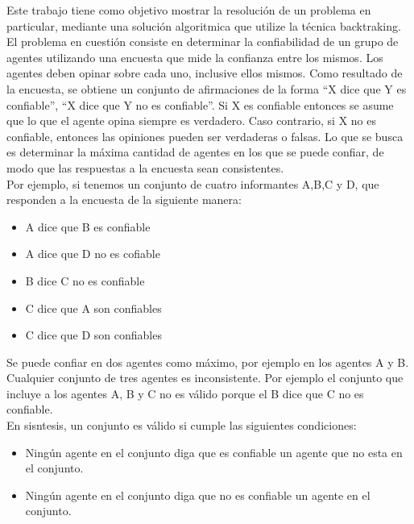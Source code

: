 \documentclass{article}
\begin{document}
Este trabajo tiene como objetivo mostrar la resolución de un problema en particular, mediante una solución algoritmica que utilize la técnica backtraking.
El problema en cuestión consiste en determinar la confiabilidad de un grupo de agentes utilizando una encuesta que mide la confianza entre los mismos. Los agentes deben opinar sobre cada uno, inclusive ellos mismos.
Como resultado de la encuesta, se obtiene un conjunto de afirmaciones de la forma “X dice que Y es confiable”, “X dice que Y no es confiable”. Si X es confiable entonces se asume que lo que el agente opina siempre es verdadero. Caso contrario, si X no es confiable, entonces las opiniones pueden ser verdaderas o falsas. Lo que se busca es determinar la máxima cantidad de agentes en los que se puede confiar, de modo que las respuestas a la encuesta sean consistentes. \\
Por ejemplo, si tenemos un conjunto de cuatro informantes A,B,C y D, que responden a la encuesta de la siguiente manera:
\begin{itemize}
	\item A dice que B es confiable
	\item A dice que D no es cofiable
	\item B dice C no es confiable
	\item C dice que A son confiables
	\item C dice que D son confiables
\end{itemize}
Se puede confiar en dos agentes como máximo, por ejemplo en los agentes A y B. Cualquier conjunto de tres agentes es inconsistente. Por ejemplo el conjunto que incluye a los agentes A, B y C no es válido porque el B dice que C no es confiable.\\
En sisntesis, un conjunto es válido si cumple las siguientes condiciones:
\begin{itemize}
	\item Ningún agente en el conjunto diga que es confiable un agente que no esta en el conjunto.
	\item Ningún agente en el conjunto diga que no es confiable un agente en el conjunto.
\end{itemize}
\end{document}
